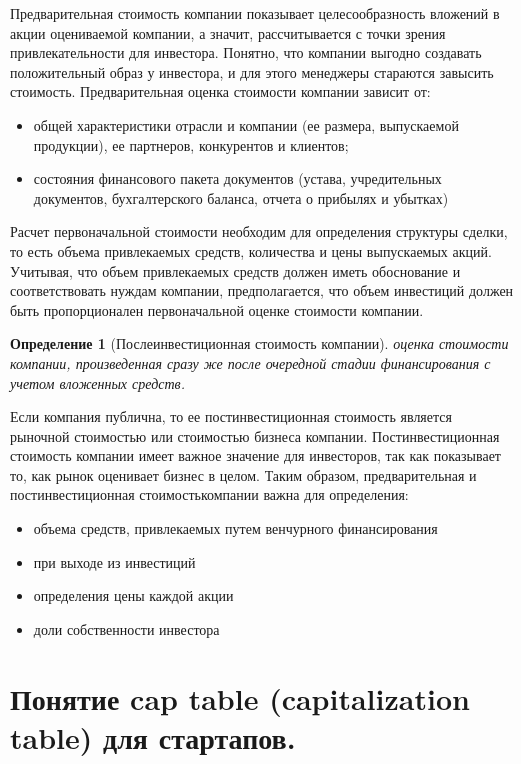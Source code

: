 \documentclass[11pt]{article}
\theoremstyle{plain} %
\newtheorem{proposition}[theorem]{Определение}
\theoremstyle{definition} %
\theoremstyle{remark} %
\begin{document}
Предварительная  стоимость  компании  показывает  целесообразность вложений  в  акции  оцениваемой  компании,  а  значит,  рассчитывается  с  точки зрения  привлекательности  для  инвестора.  Понятно,  что  компании  выгодно создавать положительный образ у инвестора, и для этого менеджеры стараются завысить стоимость. Предварительная оценка стоимости компании зависит от:
\begin{itemize}
	\item общей  характеристики  отрасли  и  компании  (ее  размера,  выпускаемой продукции), ее партнеров, конкурентов и клиентов;
	\item состояния  финансового  пакета  документов  (устава,  учредительных документов,  бухгалтерского  баланса,  отчета  о  прибылях  и  убытках)
\end{itemize}

Расчет первоначальной стоимости необходим для определения структуры сделки, то есть объема привлекаемых средств, количества и цены выпускаемых акций. Учитывая, что объем привлекаемых средств должен иметь обоснование и соответствовать нуждам  компании,  предполагается,  что  объем  инвестиций должен быть пропорционален первоначальной оценке стоимости компании.

\begin{proposition}[Послеинвестиционная стоимость компании]
	оценка  стоимости компании,  произведенная  сразу  же  после  очередной  стадии  финансирования  с учетом вложенных средств.
\end{proposition}

Если  компания  публична,  то  ее  постинвестиционная  стоимость  является рыночной стоимостью или стоимостью бизнеса компании. Постинвестиционная стоимость компании имеет важное значение для инвесторов, так как показывает то,  как  рынок  оценивает  бизнес  в  целом. Таким  образом,  предварительная  и постинвестиционная стоимостькомпании важна для определения:
\begin{itemize}
	\item объема средств, привлекаемых путем венчурного финансирования
	\item при выходе из инвестиций
	\item определения цены каждой акции
	\item доли собственности инвестора
\end{itemize}
\newpage

\section{Понятие cap table (capitalization table) для стартапов.}\label{erste}
\end{document}
